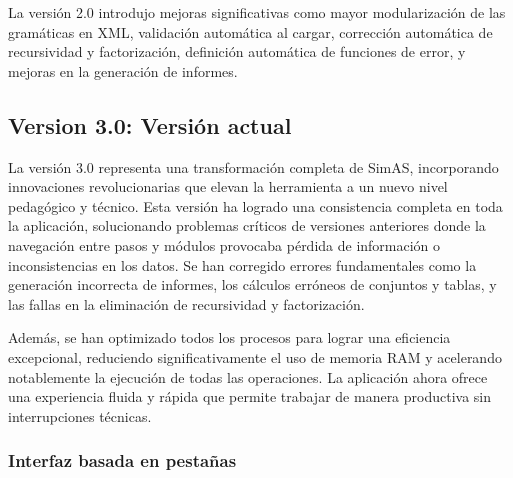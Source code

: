 La versión 2.0 introdujo mejoras significativas como mayor modularización de las gramáticas en XML, validación automática al cargar, corrección automática de recursividad y factorización, definición automática de funciones de error, y mejoras en la generación de informes.

\subsection{Version 3.0: Versión actual}

La versión 3.0 representa una transformación completa de SimAS, incorporando innovaciones revolucionarias que elevan la herramienta a un nuevo nivel pedagógico y técnico. Esta versión ha logrado una consistencia completa en toda la aplicación, solucionando problemas críticos de versiones anteriores donde la navegación entre pasos y módulos provocaba pérdida de información o inconsistencias en los datos. Se han corregido errores fundamentales como la generación incorrecta de informes, los cálculos erróneos de conjuntos y tablas, y las fallas en la eliminación de recursividad y factorización.

Además, se han optimizado todos los procesos para lograr una eficiencia excepcional, reduciendo significativamente el uso de memoria RAM y acelerando notablemente la ejecución de todas las operaciones. La aplicación ahora ofrece una experiencia fluida y rápida que permite trabajar de manera productiva sin interrupciones técnicas.

\subsubsection{Interfaz basada en pestañas}

